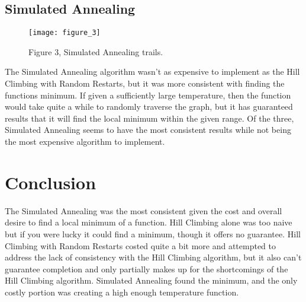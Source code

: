\documentclass[12pt]{report}
\begin{document}
\subsection{Simulated Annealing}
\begin{figure}[!ht]
    \caption{Figure 3, Simulated Annealing trails.}
    \centering
    \texttt{[image: figure\_3]}
\end{figure}
The Simulated Annealing algorithm wasn't as expensive to implement as the Hill Climbing with Random Restarts, but it was more consistent with finding the functions minimum. If given a sufficiently large temperature, then the function would take quite a while to randomly traverse the graph, but it has guaranteed results that it will find the local minimum within the given range. Of the three, Simulated Annealing seems to have the most consistent results while not being the most expensive algorithm to implement.
\FloatBarrier
\section{Conclusion}
The Simulated Annealing was the most consistent given the cost and overall desire to find a local minimum of a function. Hill Climbing alone was too naive but if you were lucky it could find a minimum, though it offers no guarantee. Hill Climbing with Random Restarts costed quite a bit more and attempted to address the lack of consistency with the Hill Climbing algorithm, but it also can't guarantee completion and only partially makes up for the shortcomings of the Hill Climbing algorithm. Simulated Annealing found the minimum, and the only costly portion was creating a high enough temperature function.
\end{document}
